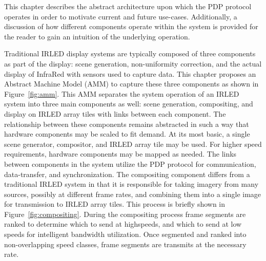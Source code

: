 \label{chap:machine_model}


This chapter describes the abstract architecture upon which the PDP protocol operates in order to motivate current and future use-cases. Additionally, a discussion of how different components operate within the system is provided for the reader to gain an intuition of the underlying operation.

Traditional IRLED display systems are typically composed of three components as part of the display: scene generation, non-uniformity correction, and the actual display of InfraRed with sensors used to capture data. This chapter proposes an Abstract Machine Model (AMM) to capture these three components as shown in Figure~\ref{fig:amm}. This AMM separates the system operation of an IRLED system into three main components as well: scene generation, compositing, and display on IRLED array tiles with links between each component. The relationship between these components remains abstracted in such a way that hardware components may be scaled to fit demand. At its most basic, a single scene generator, compositor, and IRLED array tile may be used. For higher speed requirements, hardware components may be mapped as needed. The links between components in the system utilize the PDP protocol for communication, data-transfer, and synchronization. The compositing component differs from a traditional IRLED system in that it is responsible for taking imagery from many sources, possibly at different frame rates, and combining them into a single image for transmission to IRLED array tiles. This process is briefly shown in Figure~\ref{fig:compositing}. During the compositing process frame segments are ranked to determine which to send at highspeeds, and which to send at low speeds for intelligent bandwidth utilization. Once segmented and ranked into non-overlapping speed classes, frame segments are transmits at the necessary rate.

